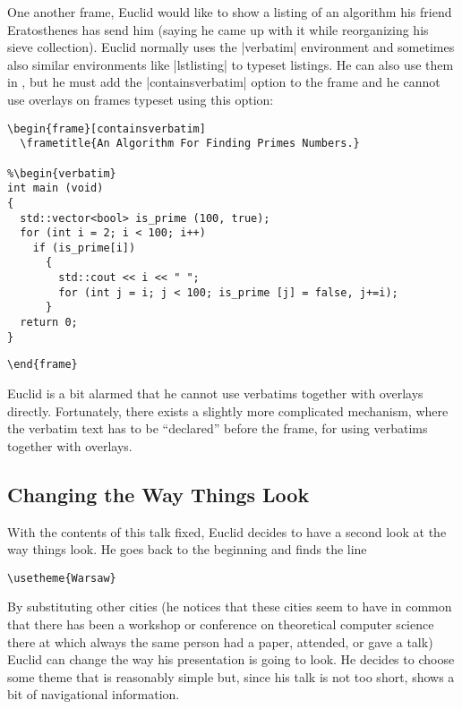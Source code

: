 One another frame, Euclid would like to show a listing of an
algorithm his friend Eratosthenes has send him (saying he came up with
it while reorganizing his sieve collection). Euclid normally uses the
|verbatim| environment and sometimes also similar environments like
|lstlisting| to typeset listings. He can also use them in \beamer, but
he must add the |containsverbatim| option to the frame and he cannot
use overlays on frames typeset using this option:
\begin{verbatim}
\begin{frame}[containsverbatim]
  \frametitle{An Algorithm For Finding Primes Numbers.}

%\begin{verbatim} 
int main (void)
{
  std::vector<bool> is_prime (100, true);
  for (int i = 2; i < 100; i++)
    if (is_prime[i])
      {
        std::cout << i << " ";
        for (int j = i; j < 100; is_prime [j] = false, j+=i);
      }
  return 0;
} 
\end{verbatim}
\unskip{\MacroFont|\end{verbatim}|}
\begin{verbatim}
\end{frame}
\end{verbatim}
Euclid is a bit alarmed that he cannot use verbatims together with
overlays directly. Fortunately, there exists a slightly more
complicated mechanism, where the verbatim text has to be ``declared''
before the frame, for using verbatims together with overlays.



\subsection{Changing the Way Things Look}

With the contents of this talk fixed, Euclid decides to have a second
look at the way things look. He goes back to the beginning and finds
the line
\begin{verbatim}
\usetheme{Warsaw}
\end{verbatim}
By substituting other cities (he notices that these cities seem to
have in common that there has been a workshop or conference on
theoretical computer science there at which always the same person had
a paper, attended, or gave a talk) Euclid can change the way his
presentation is going to look. He decides to choose some theme that is
reasonably simple but, since his talk is not too short, shows a bit of
navigational information.

